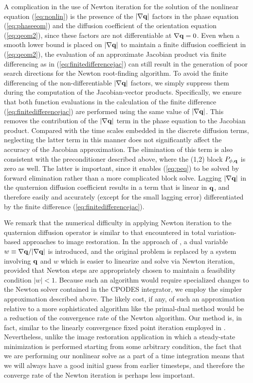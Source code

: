A complication in the use of Newton iteration for the solution of the
nonlinear equation (\ref{eq:nonlin}) is the presence of the $|\nabla
{\bf q}|$ factors in the phase equation (\ref{eq:phaseeom}) and the
diffusion coefficient of the orientation equation (\ref{eq:qeom2}),
since these factors are not differentiable at $\nabla {\bf q} = 0$.
Even when a smooth lower bound is placed on $|\nabla {\bf q}|$ to maintain a
finite diffusion coefficient in (\ref{eq:qeom2}), the evaluation of an
approximate Jacobian product via finite differencing as in
(\ref{eq:finitedifferencejac}) can still result in the generation of
poor search directions for the Newton root-finding algorithm.  To
avoid the finite differencing of the non-differentiable $|\nabla {\bf
q}|$ factors, we simply suppress them during the computation of the
Jacobian-vector products.  Specifically, we ensure that both function
evaluations in the calculation of the finite difference
(\ref{eq:finitedifferencejac}) are performed using the same value of
$|\nabla {\bf q}|$.  This removes the contribution of the $|\nabla
{\bf q}|$ term in the phase equation to the Jacobian product.
Compared with the time scales embedded in the discrete diffusion
terms, neglecting the latter term in this manner does not significantly
affect the accuracy of the Jacobian approximation.  The elimination of
this term is also consistent with the preconditioner described above, where
the (1,2) block $P_{\phi,{\bf q}}$ is zero as well.  The latter is
important, since it enables (\ref{eq:peq}) to be solved by forward
elimination rather than a more complicated block solve.  Lagging
$|\nabla {\bf q}|$ in the quaternion diffusion coefficient results in
a term that is linear in ${\bf q}$, and therefore easily and accurately
(except for the small lagging error) differentiated by the finite
difference (\ref{eq:finitedifferencejac}).

We remark that the numerical difficulty in applying Newton iteration
to the quaternion diffusion operator is similar to that encountered in
total variation-based approaches to image restoration.  In the
approach of \cite{Chan99}, a dual variable $w \equiv \nabla{\bf q} /
|\nabla{\bf q}|$ is introduced, and the original problem is replaced
by a system involving ${\bf q}$ and $w$ which is easier to linearize
and solve via Newton iteration, provided that Newton steps are
appropriately chosen to maintain a feasibility condition $|w| < 1$.
Because such an algorithm would require specialized changes to the
Newton solver contained in the CPODES integrator, we employ the
simpler approximation described above.  The likely cost, if any, of
such an approximation relative to a more sophisticated algorithm like
the primal-dual method would be a reduction of the convergence rate of
the Newton algorithm.  Our method is, in fact, similar to the linearly
convergence fixed point iteration employed in \cite{Vogel96}.
Nevertheless, unlike the image restoration application in which a
steady-state minimization is performed starting from some arbitrary
condition, the fact that we are performing our nonlinear solve as a
part of a time integration means that we will always have a good
initial guess from earlier timesteps, and therefore the converge rate
of the Newton iteration is perhaps less important.
